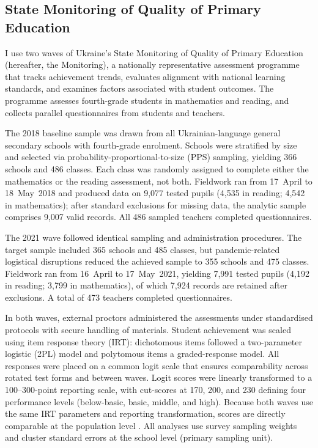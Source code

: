 
\subsection{State Monitoring of Quality of Primary Education}
\label{subsec:data_monitoring}

I use two waves of Ukraine's State Monitoring of Quality of Primary Education
(hereafter, the Monitoring), a nationally representative assessment programme
that tracks achievement trends, evaluates alignment with national learning
standards, and examines factors associated with student outcomes. The programme
assesses fourth-grade students in mathematics and reading, and collects parallel
questionnaires from students and teachers.

The 2018 baseline sample was drawn from all Ukrainian-language general secondary
schools with fourth-grade enrolment. Schools were stratified by size and selected
via prob\-ability-pro\-por\-tional-to-size (PPS) sampling, yielding 366 schools and
486 classes. Each class was randomly assigned to complete either the mathematics
or the reading assessment, not both. Fieldwork ran from 17~April to 18~May~2018
and produced data on 9,077 tested pupils (4,535 in reading; 4,542 in mathematics);
after standard exclusions for missing data, the analytic sample comprises 9,007
valid records. All 486 sampled teachers completed questionnaires.

The 2021 wave followed identical sampling and administration procedures. The
target sample included 365 schools and 485 classes, but pandemic-related logistical
disruptions reduced the achieved sample to 355 schools and 475 classes. Fieldwork
ran from 16~April to 17~May~2021, yielding 7,991 tested pupils (4,192 in reading;
3,799 in mathematics), of which 7,924 records are retained after exclusions.
A total of 473 teachers completed questionnaires.

In both waves, external proctors administered the assessments under standardised
protocols with secure handling of materials. Student achievement was scaled using
item response theory (IRT): dichotomous items followed a two-parameter logistic
(2PL) model and polytomous items a graded-response model. All responses were placed
on a common logit scale that ensures comparability across rotated test forms and
between waves. Logit scores were linearly transformed to a 100--300-point reporting
scale, with cut-scores at 170, 200, and 230 defining four performance levels
(below-basic, basic, middle, and high). Because both waves use the same IRT
parameters and reporting transformation, scores are directly comparable at the
population level \citep{uceqa2025}. All analyses use survey sampling weights
and cluster standard errors at the school level (primary sampling unit).

